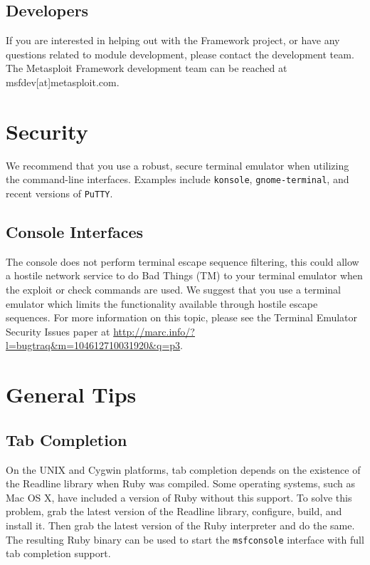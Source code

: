 \documentclass{report}
\begin{document}
\section{Developers}
\par
If you are interested in helping out with the Framework project, or have any
questions related to module development, please contact the development team. The
Metasploit Framework development team can be reached at msfdev[at]metasploit.com.

\pagebreak
\appendix

\pagebreak
\chapter{Security}

\par
We recommend that you use a robust, secure terminal emulator when
utilizing the command-line interfaces. Examples include \texttt{konsole},
\texttt{gnome-terminal}, and recent versions of \texttt{PuTTY}.

	\section{Console Interfaces}
\par
The console does not perform terminal escape sequence filtering, this
could allow a hostile network service to do Bad Things (TM) to your terminal
emulator when the exploit or check commands are used. We suggest that you
use a terminal emulator which limits the functionality available through
hostile escape sequences. For more information on this topic, please see the
Terminal Emulator Security Issues paper at
\url{http://marc.info/?l=bugtraq&m=104612710031920&q=p3}.

\pagebreak
\chapter{General Tips}

	\section{Tab Completion}
	\label{REF-TAB}
\par
On the UNIX and Cygwin platforms, tab completion depends on the existence of the Readline
library when Ruby was compiled. Some operating systems, such as Mac OS X, have included
a version of Ruby without this support. To solve this problem, grab the latest version
of the Readline library, configure, build, and install it. Then grab the latest version
of the Ruby interpreter and do the same. The resulting Ruby binary can be used to start the
\texttt{msfconsole} interface with full tab completion support.
\end{document}

